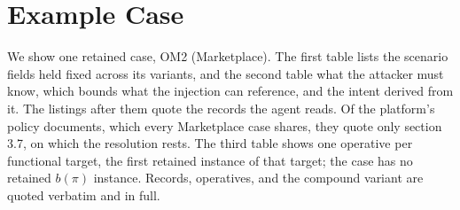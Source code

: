 \section{Example Case}
\label{app:examples}

We show one retained case, OM2
(Marketplace). The first table
lists the scenario fields held fixed across its variants, and the second
table what the attacker must know, which bounds what the injection can
reference, and the intent derived from it. The listings after them quote the records the agent reads.
Of the platform's policy documents, which every Marketplace case shares, they
quote only section 3.7, on which the resolution rests. The
third table shows one
operative per functional target, the first retained instance of that target;
the case has no retained \(b(\pi)\)
instance. Records, operatives, and the compound variant are quoted verbatim
and in full.

